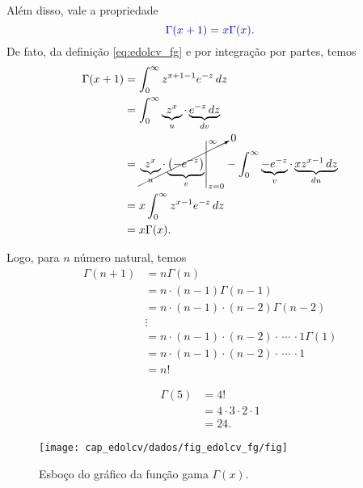 Além disso, vale a propriedade
\begin{equation}\label{eq:edolcv_fgp1}
  {\color{blue}\Gamma(x+1) = x\Gamma(x)}.
\end{equation}
De fato, da definição \eqref{eq:edolcv_fg} e por integração por partes, temos
\begin{align}
  \Gamma(x+1) &= \int_0^\infty z^{x+1-1}e^{-z}\,dz\\
  &= \int_0^\infty \underbrace{z^x}_{u}\cdot \underbrace{e^{-z}\,dz}_{dv}\\
  &= \cancelto{0}{\left.\underbrace{z^x}_{u}\cdot\underbrace{\left(-e^{-z}\right)}_{v}\right|_{z=0}^\infty} - \int_{0}^\infty \underbrace{-e^{-z}}_{v}\cdot \underbrace{xz^{x-1}\,dz}_{du}\\
  &= x\int_0^\infty z^{x-1}e^{-z}\,dz\\
  &= x\Gamma(x).
\end{align}

Logo, para $n$ número natural, temos
\begin{align}
  \Gamma(n+1) &= n\Gamma(n)\\
  &=n\cdot (n-1)\Gamma(n-1)\\
  &=n\cdot (n-1)\cdot (n-2)\Gamma(n-2)\\
  &\vdots\\
  &= n\cdot (n-1)\cdot (n-2)\cdot\, \cdots\, \cdot 1\Gamma(1)\\
  &= n\cdot (n-1)\cdot (n-2)\cdot\, \cdots\, \cdot 1 \\
  &= n!
\end{align}

\begin{ex}
  \begin{align}
    \Gamma(5) &= 4! \\
    &= 4\cdot 3\cdot 2\cdot 1 \\
    &= 24.
  \end{align}
\end{ex}

\begin{figure}[H]
  \centering
  \texttt{[image: cap\_edolcv/dados/fig\_edolcv\_fg/fig]}
  \caption{Esboço do gráfico da função gama $\Gamma(x)$.}
  \label{fig:edolcv_fg}
\end{figure}

